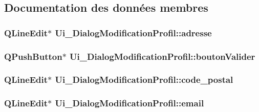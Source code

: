 \subsection{Documentation des données membres}
\hypertarget{class_ui___dialog_modification_profil_abd307db23d2f04b3a0e4a596cdbe8656}{
\subsubsection[{adresse}]{\setlength{\rightskip}{0pt plus 5cm}Q\-Line\-Edit$\ast$ Ui\-\_\-\-Dialog\-Modification\-Profil\-::adresse}}\label{class_ui___dialog_modification_profil_abd307db23d2f04b3a0e4a596cdbe8656}
\hypertarget{class_ui___dialog_modification_profil_af20fdf74b0575d4e4a83b3fdd78b773d}{
\subsubsection[{bouton\-Valider}]{\setlength{\rightskip}{0pt plus 5cm}Q\-Push\-Button$\ast$ Ui\-\_\-\-Dialog\-Modification\-Profil\-::bouton\-Valider}}\label{class_ui___dialog_modification_profil_af20fdf74b0575d4e4a83b3fdd78b773d}
\hypertarget{class_ui___dialog_modification_profil_a93b6c690c6707d373fc814a119821546}{
\subsubsection[{code\-\_\-postal}]{\setlength{\rightskip}{0pt plus 5cm}Q\-Line\-Edit$\ast$ Ui\-\_\-\-Dialog\-Modification\-Profil\-::code\-\_\-postal}}\label{class_ui___dialog_modification_profil_a93b6c690c6707d373fc814a119821546}
\hypertarget{class_ui___dialog_modification_profil_a8031c71ba4f8adc3d82bc08d73190f53}{
\subsubsection[{email}]{\setlength{\rightskip}{0pt plus 5cm}Q\-Line\-Edit$\ast$ Ui\-\_\-\-Dialog\-Modification\-Profil\-::email}}\label{class_ui___dialog_modification_profil_a8031c71ba4f8adc3d82bc08d73190f53}
